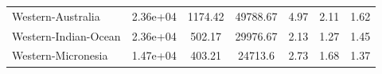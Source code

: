 \begin{table}[H]
{\begin{tabular}{lcccccc}
            \\
            Western-Australia                          & 2.36e+04 & 1174.42 &
            49788.67                                   &
            4.97                                       & 2.11     & 1.62
            \\
            Western-Indian-Ocean                       & 2.36e+04 & 502.17  &
            29976.67                                   &
            2.13                                       & 1.27     & 1.45
            \\
            Western-Micronesia                         & 1.47e+04 & 403.21  &
            24713.6                                    &
            2.73                                       & 1.68     & 1.37
            \\
            \hline
        \end{tabular}%
    }
\end{table}


